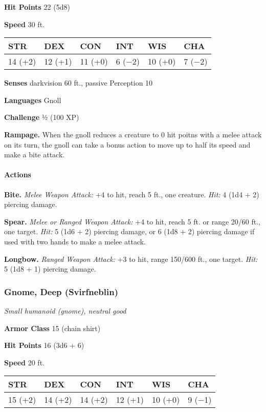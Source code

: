 \documentclass[
]{article}
\begin{document}
\textbf{Hit Points} 22 (5d8)

\textbf{Speed} 30 ft.

\begin{longtable}[]{@{}llllll@{}}
\toprule
STR & DEX & CON & INT & WIS & CHA\tabularnewline
\midrule
\endhead
14 (+2) & 12 (+1) & 11 (+0) & 6 (−2) & 10 (+0) & 7 (−2)\tabularnewline
\bottomrule
\end{longtable}

\textbf{Senses} darkvision 60 ft., passive Perception 10

\textbf{Languages} Gnoll

\textbf{Challenge} ½ (100 XP)

\textbf{Rampage.} When the gnoll reduces a creature to 0 hit poitns with
a melee attack on its turn, the gnoll can take a bonus action to move up
to half its speed and make a bite attack.

\hypertarget{actions-13}{%
\paragraph{Actions}\label{actions-13}}

\textbf{Bite.} \emph{Melee Weapon Attack:} +4 to hit, reach 5 ft., one
creature. \emph{Hit:} 4 (1d4 + 2) piercing damage.

\textbf{Spear.} \emph{Melee or Ranged Weapon Attack:} +4 to hit, reach 5
ft. or range 20/60 ft., one target. \emph{Hit:} 5 (1d6 + 2) piercing
damage, or 6 (1d8 + 2) piercing damage if used with two hands to make a
melee attack.

\textbf{Longbow.} \emph{Ranged Weapon Attack:} +3 to hit, range 150/600
ft., one target. \emph{Hit:} 5 (1d8 + 1) piercing damage.

\hypertarget{gnome-deep-svirfneblin}{%
\subsubsection{Gnome, Deep (Svirfneblin)}\label{gnome-deep-svirfneblin}}

\emph{Small humanoid (gnome), neutral good}

\textbf{Armor Class} 15 (chain shirt)

\textbf{Hit Points} 16 (3d6 + 6)

\textbf{Speed} 20 ft.

\begin{longtable}[]{@{}llllll@{}}
\toprule
STR & DEX & CON & INT & WIS & CHA\tabularnewline
\midrule
\endhead
15 (+2) & 14 (+2) & 14 (+2) & 12 (+1) & 10 (+0) & 9 (−1)\tabularnewline
\bottomrule
\end{longtable}
\end{document}
